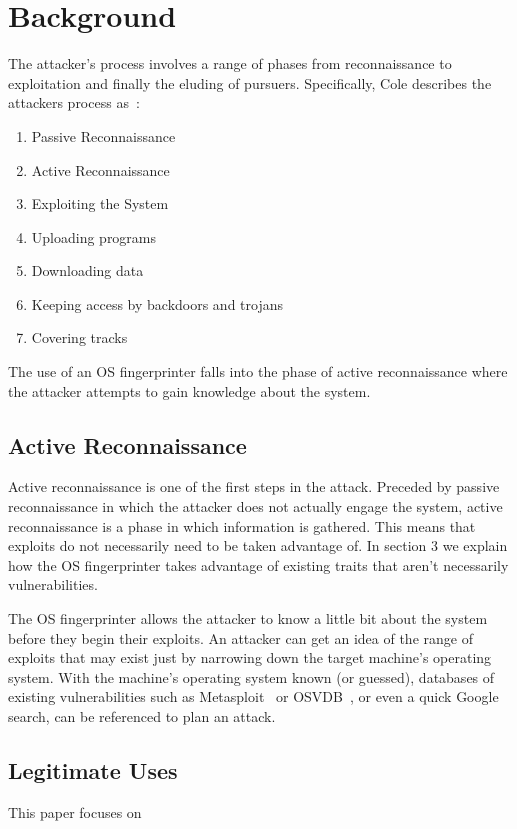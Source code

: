 \section{Background}

The attacker's process involves a range of phases from reconnaissance to exploitation and finally the eluding of pursuers. Specifically, Cole describes the attackers process as~\cite{Cole02}:

\begin{enumerate}
	\item Passive Reconnaissance
	\item Active Reconnaissance
	\item Exploiting the System
	\item Uploading programs
	\item Downloading data
	\item Keeping access by backdoors and trojans
	\item Covering tracks
\end{enumerate}

The use of an OS fingerprinter falls into the phase of active reconnaissance where the attacker attempts to gain knowledge about the system. 

\subsection{Active Reconnaissance}
Active reconnaissance is one of the first steps in the attack. Preceded by passive reconnaissance in which the attacker does not actually engage the system, active reconnaissance is a phase in which information is gathered. This means that exploits do not necessarily need to be taken advantage of. In section 3 we explain how the OS fingerprinter takes advantage of existing traits that aren't necessarily vulnerabilities.

The OS fingerprinter allows the attacker to know a little bit about the system before they begin their exploits. An attacker can get an idea of the range of exploits that may exist just by narrowing down the target machine's operating system. With the machine's operating system known (or guessed), databases of existing vulnerabilities such as Metasploit~\cite{Metasploit1} or OSVDB~\cite{OSVDB1}, or even a quick Google search, can be referenced to plan an attack.


\subsection{Legitimate Uses}
This paper focuses on 
